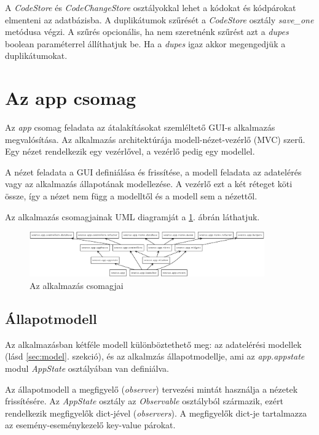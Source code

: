 A \emph{CodeStore} és \emph{CodeChangeStore} osztályokkal lehet a kódokat és kódpárokat
elmenteni az adatbázisba.
A duplikátumok szűrését a \emph{CodeStore} osztály \emph{save\_one} metódusa végzi.
A szűrés opcionális, ha nem szeretnénk szűrést azt a \emph{dupes} boolean paraméterrel állíthatjuk be.
Ha a \emph{dupes} igaz akkor megengedjük a duplikátumokat.


\section{Az app csomag}

Az \emph{app} csomag feladata az átalakításokat szemléltető GUI-s alkalmazás megvalósítása.
Az alkalmazás architektúrája modell-nézet-vezérlő (MVC) szerű.
Egy nézet rendelkezik egy vezérlővel, a vezérlő pedig egy modellel.

A nézet feladata a GUI definiálása és frissítése,
a modell feladata az adatelérés vagy az alkalmazás állapotának modellezése.
A vezérlő ezt a két réteget köti össze, így a nézet nem függ a modelltől és a modell sem a nézettől.

Az alkalmazás csomagjainak UML diagramját a \ref{fig:app_packages}. ábrán láthatjuk.

\begin{figure}[H]
	\centering
	\includegraphics[width=0.9\textwidth]{images/uml/apppackages.eps}
	\caption{\label{fig:app_packages}Az alkalmazás csomagjai}
\end{figure}

\subsection{Állapotmodell}
\label{subsec:appstate}

Az alkalmazásban kétféle modell különböztethető meg:
az adatelérési modellek (lásd \ref{sec:model}. szekció),
és az alkalmzás állapotmodellje, ami az \emph{app.appstate} modul 
\emph{AppState} osztályában van definiálva.

Az állapotmodell a megfigyelő (\emph{observer}) tervezési mintát használja a nézetek frissítésére.
Az \emph{AppState} osztály az \emph{Observable} osztályból származik,
ezért rendelkezik megfigyelők dict-jével (\emph{observers}).
A megfigyelők dict-je tartalmazza az esemény-eseménykezelő key-value párokat.

